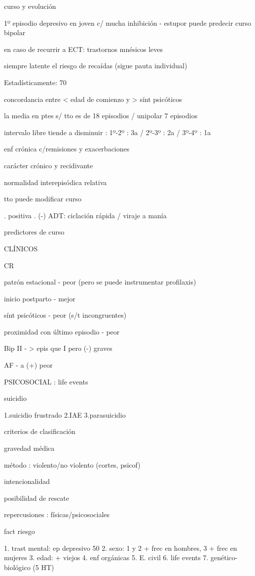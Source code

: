 curso y evolución

1º episodio depresivo en joven c/ mucha inhibición - estupor puede predecir curso bipolar

en caso de recurrir a ECT: trastornos mnésicos leves

siempre latente el riesgo de recaídas (sigue pauta individual)

Estadísticamente: 70%

concordancia entre < edad de comienzo y > sínt psicóticos

la media en ptes s/ tto es de 18 episodios / unipolar 7 episodios

intervalo libre tiende a disminuir : 1º-2º : 3a / 2º-3º : 2a / 3º-4º : 1a

enf crónica c/remisiones y exacerbaciones

carácter crónico y recidivante

normalidad interepisódica relativa

tto puede modificar curso

. positiva
. (-) ADT: ciclación rápida / viraje a manía

predictores de curso

CLÍNICOS

CR

patrón estacional - peor (pero se puede instrumentar profilaxis)

inicio postparto - mejor

sínt psicóticos - peor (s/t incongruentes)

proximidad con último episodio - peor

Bip II - > epis que I pero (-) graves

AF - a (+) peor

PSICOSOCIAL : life events

suicidio

1.suicidio frustrado
2.IAE
3.parasuicidio

criterios de clasificación

gravedad médica

método : violento/no violento (cortes, psicof)

intencionalidad

posibilidad de rescate

repercusiones : físicas/psicosociales

fact riesgo

1. trast mental: ep depresivo 50%
2. sexo: 1 y 2 + frec en hombres, 3 + frec en mujeres
3. edad: + viejos
4. enf orgánicas
5. E. civil
6. life events
7. genético-biológico (5 HT)

